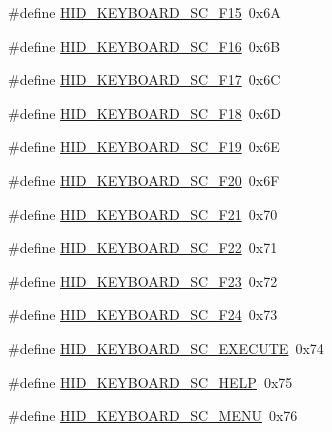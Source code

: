 \begin{DoxyCompactItemize}
\item 
\#define \hyperlink{group__Group__USBClassHIDCommon_gafbb6bc0edfaf67bde5d7dd2ba9626e35}{H\+I\+D\+\_\+\+K\+E\+Y\+B\+O\+A\+R\+D\+\_\+\+S\+C\+\_\+\+F15}~0x6A
\item 
\#define \hyperlink{group__Group__USBClassHIDCommon_ga06a20d3b539d0e04ce9c9e9a0fba3bab}{H\+I\+D\+\_\+\+K\+E\+Y\+B\+O\+A\+R\+D\+\_\+\+S\+C\+\_\+\+F16}~0x6B
\item 
\#define \hyperlink{group__Group__USBClassHIDCommon_gac87d9ceab6a6bb15516ffbf78feee3c6}{H\+I\+D\+\_\+\+K\+E\+Y\+B\+O\+A\+R\+D\+\_\+\+S\+C\+\_\+\+F17}~0x6C
\item 
\#define \hyperlink{group__Group__USBClassHIDCommon_ga301f158b1923044c59648355f320b0d7}{H\+I\+D\+\_\+\+K\+E\+Y\+B\+O\+A\+R\+D\+\_\+\+S\+C\+\_\+\+F18}~0x6D
\item 
\#define \hyperlink{group__Group__USBClassHIDCommon_ga69a08a0fa813ae65be19686018e35997}{H\+I\+D\+\_\+\+K\+E\+Y\+B\+O\+A\+R\+D\+\_\+\+S\+C\+\_\+\+F19}~0x6E
\item 
\#define \hyperlink{group__Group__USBClassHIDCommon_gab76c4d1c1995fc1e2c40eecbc6500f8b}{H\+I\+D\+\_\+\+K\+E\+Y\+B\+O\+A\+R\+D\+\_\+\+S\+C\+\_\+\+F20}~0x6F
\item 
\#define \hyperlink{group__Group__USBClassHIDCommon_ga3426d6ef863261f31248594c1e4515cb}{H\+I\+D\+\_\+\+K\+E\+Y\+B\+O\+A\+R\+D\+\_\+\+S\+C\+\_\+\+F21}~0x70
\item 
\#define \hyperlink{group__Group__USBClassHIDCommon_gaa2fc32175e5beb9bb904f12fc76c69ca}{H\+I\+D\+\_\+\+K\+E\+Y\+B\+O\+A\+R\+D\+\_\+\+S\+C\+\_\+\+F22}~0x71
\item 
\#define \hyperlink{group__Group__USBClassHIDCommon_gab1ff15252b2623b9c24eaa6f13130b03}{H\+I\+D\+\_\+\+K\+E\+Y\+B\+O\+A\+R\+D\+\_\+\+S\+C\+\_\+\+F23}~0x72
\item 
\#define \hyperlink{group__Group__USBClassHIDCommon_gaa862417573705d6479b063c209d725d7}{H\+I\+D\+\_\+\+K\+E\+Y\+B\+O\+A\+R\+D\+\_\+\+S\+C\+\_\+\+F24}~0x73
\item 
\#define \hyperlink{group__Group__USBClassHIDCommon_gad0a1455629b1b57ef8e9c8f2be53e017}{H\+I\+D\+\_\+\+K\+E\+Y\+B\+O\+A\+R\+D\+\_\+\+S\+C\+\_\+\+E\+X\+E\+C\+U\+TE}~0x74
\item 
\#define \hyperlink{group__Group__USBClassHIDCommon_ga9c97f9763e96e2a82d1dfc61d016dd84}{H\+I\+D\+\_\+\+K\+E\+Y\+B\+O\+A\+R\+D\+\_\+\+S\+C\+\_\+\+H\+E\+LP}~0x75
\item 
\#define \hyperlink{group__Group__USBClassHIDCommon_ga105da2d4da56b1f0d376c91669ce8607}{H\+I\+D\+\_\+\+K\+E\+Y\+B\+O\+A\+R\+D\+\_\+\+S\+C\+\_\+\+M\+E\+NU}~0x76

\end{DoxyCompactItemize}
